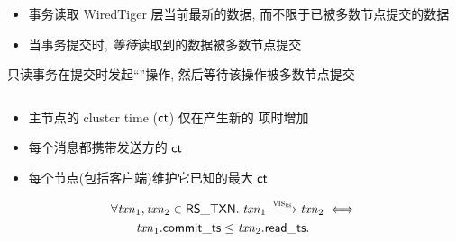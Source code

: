 \begin{frame}{}
  
\end{frame}

\begin{frame}{}
  \begin{center}

	\vspace{0.30cm}
	\begin{itemize}
	  \item 事务读取 WiredTiger 层当前最新的数据, 而不限于已被多数节点提交的数据
	  \item 当事务提交时, \emph{等待}读取到的数据被多数节点提交
	\end{itemize}

	\pause
	只读事务在提交时发起``\noop''操作, 然后等待该操作被多数节点提交
  \end{center}
\end{frame}

\begin{frame}{}

  \begin{columns}
	  
  \end{columns}

  \pause
  \vspace{0.30cm}
  \begin{center}
	\begin{itemize}
	  \setlength{\itemsep}{6pt}
	  \item 主节点的 cluster time ($\sf ct$) 仅在产生新的 \oplog{} 项时增加
	  \item 每个消息都携带发送方的 $\sf ct$
	  \item 每个节点(包括客户端)维护它已知的最大 $\sf ct$
	\end{itemize}
  \end{center}
\end{frame}

\begin{frame}{}
  \begin{definition}
	\vspace{-0.30cm}
	\begin{align*}
      &\forall \mathit{txn}_{1}, \mathit{txn}_{2} \in {\sf RS\_TXN}.\;
        \mathit{txn}_{1} \xrightarrow{\textsc{vis}_{\textsc{rs}}} \mathit{txn}_{2} \iff \\
        &\qquad \mathit{txn}_{1}.{\sf commit\_ts} \le \mathit{txn}_{2}.{\sf read\_ts}.
	\end{align*}
  \end{definition}
\end{frame}

